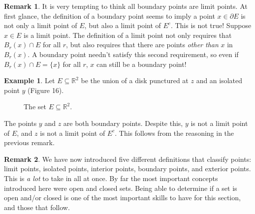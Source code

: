 \documentclass{article}
\newcommand{\R}{\mathbb{R}}
\theoremstyle{definition}
\newtheorem{example}{Example}[section]
\newtheorem{remark}{Remark}[section]
\begin{document}
	\begin{remark}
		It is very tempting to think all boundary points are limit points. At first glance, the definition of a boundary point seems to imply a point $ x\in\partial E $ is not only a limit point of $ E $, but also a limit point of $ E^c $. This is not true! Suppose $ x\in E $ is a limit point. The definition of a limit point not only requires that $ B_r(x)\cap E $ for all $ r $, but also requires that there are points \textit{other than} $ x $ in $ B_r(x) $. A boundary point needn't satisfy this second requirement, so even if $ B_r(x)\cap E=\{x\} $ for all $ r $, $ x $ can still be a boundary point! 
	\end{remark}
	
	\begin{example}
		Let $ E\subseteq \R^2 $ be the union of a disk punctured at $ z $ and an isolated point $ y $ (Figure 16).  
		\begin{figure}[h]
			\centering
			\caption{The set $ E\subseteq \R^2 $.}
		\end{figure}
		
		The points $ y $ and $ z $ are both boundary points. Despite this, $ y $ is not a limit point of $ E $, and $ z $ is not a limit point of $ E^c $. This follows from the reasoning in the previous remark.  	
	\end{example}
	
	\begin{remark}
		We have now introduced five different definitions that classify points: limit points, isolated points, interior points, boundary points, and exterior points. This is \textit{a lot} to take in all at once. By far the most important concepts introduced here were open and closed sets. Being able to determine if a set is open and/or closed is one of the most important skills to have for this section, and those that follow. 
	\end{remark}
\end{document}
